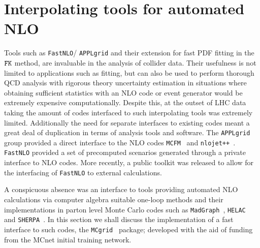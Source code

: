 %

%
%

\section{Interpolating tools for automated NLO}
Tools such as { \tt FastNLO}/{ \tt APPLgrid} and their extension for fast PDF fitting in the $\tt FK$ method, are invaluable in the analysis of collider data. Their usefulness is not limited to applications such as fitting, but can also be used to perform thorough QCD analysis with rigorous theory uncertainty estimation in situations where obtaining sufficient statistics with an NLO code or event generator would be extremely expensive computationally. Despite this, at the outset of LHC data taking the amount of codes interfaced to such interpolating tools was extremely limited. Additionally the need for separate interfaces to existing codes meant a great deal of duplication in terms of analysis tools and software.  The { \tt APPLgrid} group provided a direct interface to the NLO codes {\tt MCFM}~\cite{Campbell:2000bg} and {\tt nlojet++}~\cite{Nagy:2001fj,Nagy:2003tz}. { \tt FastNLO} provided a set of precomputed scenarios generated through a private interface to NLO codes. More recently, a public toolkit was released to allow for the interfacing of { \tt FastNLO} to external calculations. 

A conspicuous absence was an interface to tools providing automated NLO calculations via computer algebra suitable one-loop methods\cite{Anastasiou:2006jv,Berger:2008sj,Denner:2005nn,Ellis:2007br,Giele:2008ve,Ossola:2006us} and their implementations in parton level Monte Carlo codes such as {\tt MadGraph}~\cite{Alwall:2011uj}, {\tt HELAC}~\cite{Bevilacqua:2011xh} and {\tt SHERPA}~\cite{Gleisberg:2003xi,Gleisberg:2008ta}. In this section we shall discuss the implementation of a fast interface to such codes, the {\tt MCgrid}~\cite{DelDebbio:2013kxa} package; developed with the aid of funding from the MCnet initial training network.  


